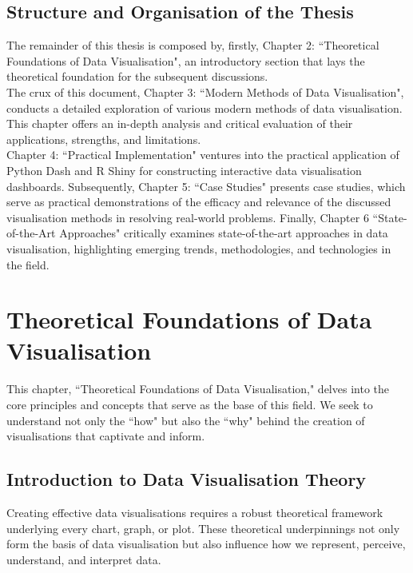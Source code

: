\documentclass{article}\usepackage[]{graphicx}\usepackage[]{xcolor}
\begin{document}
\subsection{Structure and Organisation of the Thesis}

The remainder of this thesis is composed by, firstly, Chapter 2: ``Theoretical Foundations of Data Visualisation", an introductory section that lays the theoretical foundation for the subsequent discussions.\\

\noindent 
The crux of this document, Chapter 3: ``Modern Methods of Data Visualisation", conducts a detailed exploration of various modern methods of data visualisation. This chapter offers an in-depth analysis and critical evaluation of their applications, strengths, and limitations.\\

\noindent 
Chapter 4: ``Practical Implementation" ventures into the practical application of Python Dash and R Shiny for constructing interactive data visualisation dashboards. Subsequently, Chapter 5: ``Case Studies" presents case studies, which serve as practical demonstrations of the efficacy and relevance of the discussed visualisation methods in resolving real-world problems. Finally, Chapter 6 ``State-of-the-Art Approaches" critically examines state-of-the-art approaches in data visualisation, highlighting emerging trends, methodologies, and technologies in the field.

\newpage 


\section{Theoretical Foundations of Data Visualisation}
This chapter, ``Theoretical Foundations of Data Visualisation," delves into the core principles and concepts that serve as the base of this field. We seek to understand not only the ``how" but also the ``why" behind the creation of visualisations that captivate and inform.

\subsection{Introduction to Data Visualisation Theory}
Creating effective data visualisations requires a robust theoretical framework underlying every chart, graph, or plot. These theoretical underpinnings not only form the basis of data visualisation but also influence how we represent, perceive, understand, and interpret data.\\ 
\end{document}
